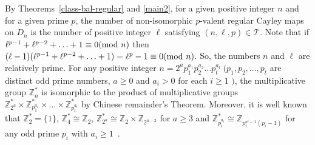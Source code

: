 \documentclass[12pt]{amsart}
\begin{document}
By Theorems~\ref{class-bal-regular} and \ref{main2}, for a given
positive integer $n$ and for a given prime $p$, the number of
non-isomorphic $p$-valent regular Cayley maps on $D_n$ is the
number of positive integer $\ell$ satisfying $(n, \ell, p) \in
\mathcal{T}$. Note that if $\ell^{p-1} + \ell^{p-2} + \ldots + 1
\equiv 0 ({\hbox{\rm mod }} n)$ then $(\ell-1)(\ell^{p-1} + \ell^{p-2} + \ldots
+ 1) = \ell^{p} - 1 \equiv 0 ({\hbox{\rm mod }} n)$. So, the numbers $n$ and
$\ell$ are relatively prime.  For any positive integer $n =
2^ap_{1}^{a_{1}}p_{2}^{a_{2}}\ldots p_{t}^{a_{t}}~( p_{1}, p_{2},
\ldots, p_{t}$ are distinct odd prime numbers, $a \geq 0$ and
$a_{i}
> 0$ for each $i \geq 1$  $)$, the multiplicative group
$\mathbb{Z}_n^{*}$ is isomorphic to the product of  multiplicative
groups $\mathbb{Z}_{2^a}^{*} \times
\mathbb{Z}_{p_1^{a_1}}^{*}\times \ldots \times
\mathbb{Z}_{p_t^{a_t}}^{*}$ by Chinese remainder's Theorem.
Moreover, it is well known that $\mathbb{Z}_2^{*} = \{ 1 \}$,
$\mathbb{Z}_{4}^{*} \cong \mathbb{Z}_2$, $\mathbb{Z}_{2^a}^{*}
\cong \mathbb{Z}_2 \times \mathbb{Z}_{2^{a-2}}$ for $a \geq 3$ and
$\mathbb{Z}_{p_i^{a_i}}^{*} \cong \mathbb{Z}_{p_i^{a^i-1}(p_i-1)}$
for any odd prime $p_i$ with $a_i \geq 1$~\cite{JR}.
\end{document}
